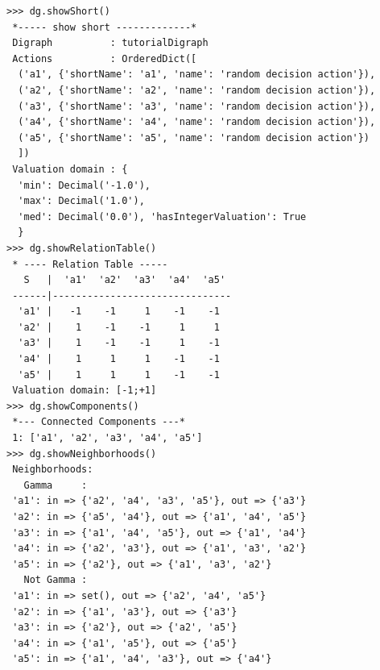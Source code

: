 \begin{lstlisting}[caption={Random crisp digraph object},label=list:1.3]
>>> dg.showShort()
 *----- show short -------------*
 Digraph          : tutorialDigraph
 Actions          : OrderedDict([
  ('a1', {'shortName': 'a1', 'name': 'random decision action'}),
  ('a2', {'shortName': 'a2', 'name': 'random decision action'}),
  ('a3', {'shortName': 'a3', 'name': 'random decision action'}),
  ('a4', {'shortName': 'a4', 'name': 'random decision action'}),
  ('a5', {'shortName': 'a5', 'name': 'random decision action'})
  ])
 Valuation domain : {
  'min': Decimal('-1.0'),
  'max': Decimal('1.0'),
  'med': Decimal('0.0'), 'hasIntegerValuation': True
  }
>>> dg.showRelationTable()
 * ---- Relation Table -----
   S   |  'a1'  'a2'  'a3'  'a4'  'a5'
 ------|-------------------------------
  'a1' |   -1    -1     1    -1    -1
  'a2' |    1    -1    -1     1     1
  'a3' |    1    -1    -1     1    -1
  'a4' |    1     1     1    -1    -1
  'a5' |    1     1     1    -1    -1
 Valuation domain: [-1;+1]
>>> dg.showComponents()
 *--- Connected Components ---*
 1: ['a1', 'a2', 'a3', 'a4', 'a5']
>>> dg.showNeighborhoods()
 Neighborhoods:
   Gamma     :
 'a1': in => {'a2', 'a4', 'a3', 'a5'}, out => {'a3'}
 'a2': in => {'a5', 'a4'}, out => {'a1', 'a4', 'a5'}
 'a3': in => {'a1', 'a4', 'a5'}, out => {'a1', 'a4'}
 'a4': in => {'a2', 'a3'}, out => {'a1', 'a3', 'a2'}
 'a5': in => {'a2'}, out => {'a1', 'a3', 'a2'}
   Not Gamma :
 'a1': in => set(), out => {'a2', 'a4', 'a5'}
 'a2': in => {'a1', 'a3'}, out => {'a3'}
 'a3': in => {'a2'}, out => {'a2', 'a5'}
 'a4': in => {'a1', 'a5'}, out => {'a5'}
 'a5': in => {'a1', 'a4', 'a3'}, out => {'a4'}
\end{lstlisting}

